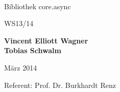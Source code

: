 \thispagestyle{empty}

\begin{center}


{\Huge \thetitle}\\

\vspace{20mm}
\begin{huge}
Bibliothek core.async
\end{huge}
\vspace{15mm}

\begin{Large}
WS13/14
\end{Large}

\vspace{15mm}
\begin{Large}
\textbf{Vincent Elliott Wagner}\\
\textbf{Tobias Schwalm}\\
\end{Large}
\vspace{15mm}
\begin{large}
März 2014
\end{large}

\vspace{15mm}
\begin{large}
Referent: Prof. Dr. Burkhardt Renz\\
\end{large}

\end{center}